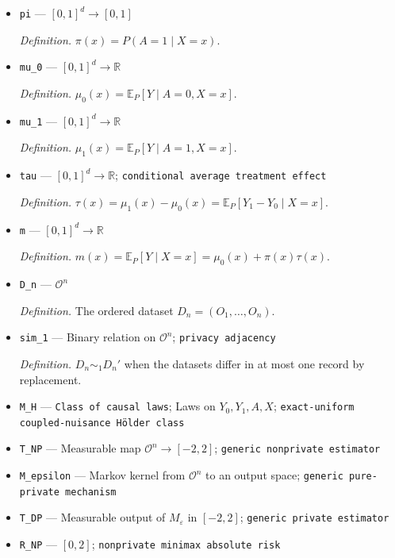 \documentclass{article}
\begin{document}
\begin{itemize}
  \par\smallskip\noindent\emph{Definition.} The \(X\)-marginal of \(P\).
  \item \texttt{pi} --- \([0,1]^d\to[0,1]\)
  \par\smallskip\noindent\emph{Definition.} \(\pi(x)=P(A=1\mid X=x)\).
  \item \texttt{mu\_\allowbreak{}0} --- \([0,1]^d\to\mathbb R\)
  \par\smallskip\noindent\emph{Definition.} \(\mu_0(x)=\mathbb E_P[Y\mid A=0,X=x]\).
  \item \texttt{mu\_\allowbreak{}1} --- \([0,1]^d\to\mathbb R\)
  \par\smallskip\noindent\emph{Definition.} \(\mu_1(x)=\mathbb E_P[Y\mid A=1,X=x]\).
  \item \texttt{tau} --- \([0,1]^d\to\mathbb R\); \texttt{conditional average treatment effect}
  \par\smallskip\noindent\emph{Definition.} \(\tau(x)=\mu_1(x)-\mu_0(x)=\mathbb E_P[Y_1-Y_0\mid X=x]\).
  \item \texttt{m} --- \([0,1]^d\to\mathbb R\)
  \par\smallskip\noindent\emph{Definition.} \(m(x)=\mathbb E_P[Y\mid X=x]=\mu_0(x)+\pi(x)\tau(x)\).
  \item \texttt{D\_\allowbreak{}n} --- \(\mathcal O^n\)
  \par\smallskip\noindent\emph{Definition.} The ordered dataset \(D_n=(O_1,\ldots,O_n)\).
  \item \texttt{sim\_\allowbreak{}1} --- Binary relation on \(\mathcal O^n\); \texttt{privacy adjacency}
  \par\smallskip\noindent\emph{Definition.} \(D_n\sim_1D_n'\) when the datasets differ in at most one record by replacement.
  \item \texttt{M\_\allowbreak{}H} --- \texttt{Class of causal laws}; Laws on \(Y_0,Y_1,A,X\); \texttt{exact-\allowbreak{}uniform coupled-\allowbreak{}nuisance Hölder class}
  \item \texttt{T\_\allowbreak{}NP} --- Measurable map \(\mathcal O^n\to[-2,2]\); \texttt{generic nonprivate estimator}
  \item \texttt{M\_\allowbreak{}epsilon} --- Markov kernel from \(\mathcal O^n\) to an output space; \texttt{generic pure-\allowbreak{}private mechanism}
  \item \texttt{T\_\allowbreak{}DP} --- Measurable output of \(M_\varepsilon\) in \([-2,2]\); \texttt{generic private estimator}
  \item \texttt{R\_\allowbreak{}NP} --- \([0,2]\); \texttt{nonprivate minimax absolute risk}

\end{itemize}
\end{document}
